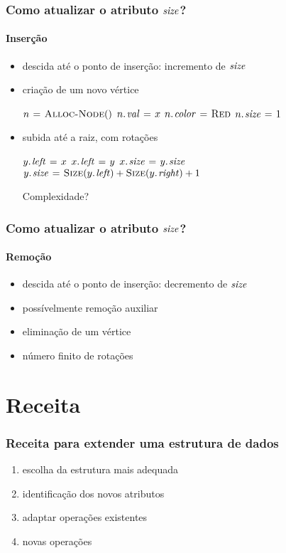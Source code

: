 \documentclass{beamer}
\begin{document}
\begin{frame}
\frametitle{Como atualizar o atributo $\id{size}$?}
\framesubtitle{Inserção}

\begin{itemize}
\item descida até o ponto de inserção: incremento de $\id{size}$
\pause\item criação de um novo vértice
\begin{codebox}
\li $n \mathrel{\hspace{1pt}=\hspace{1pt}} \textnormal{\scshape Alloc-Node}()$
\li $\attrib{n}{val} \gets x$
\li $\attrib{n}{color} \gets \const{Red}$
\li $\attrib{n}{size} \gets 1$
\end{codebox}
\pause\item subida até a raiz, com rotações
\begin{codebox}
\zi {}
\li $\attrib{y}{left} \gets x$
\li $\attrib{x}{left} \gets y$
\li $\attrib{x}{size} \gets \attrib{y}{size}$
\li $\attrib{y}{size} \gets \proc{Size}(\attrib{y}{left}) + \proc{Size}(\attrib{y}{right}) + 1$
\end{codebox}
\pause\alert{Complexidade?}
\end{itemize}
\end{frame}

\begin{frame}
\frametitle{Como atualizar o atributo $\id{size}$?}
\framesubtitle{Remoção}

\begin{itemize}
\item descida até o ponto de inserção: decremento de $\id{size}$  
\item possívelmente remoção auxiliar
\item eliminação de um vértice \only<2>{\alert{$O(1)$}}
\item número finito de rotações 
\end{itemize}

\end{frame}

\section{Receita}
\begin{frame}
\frametitle{Receita para extender uma estrutura de dados}

\begin{enumerate}
\item escolha da estrutura mais adequada
\item identificação dos novos atributos
\item adaptar operações existentes
\item novas operações
\end{enumerate}

\end{frame}
\end{document}

